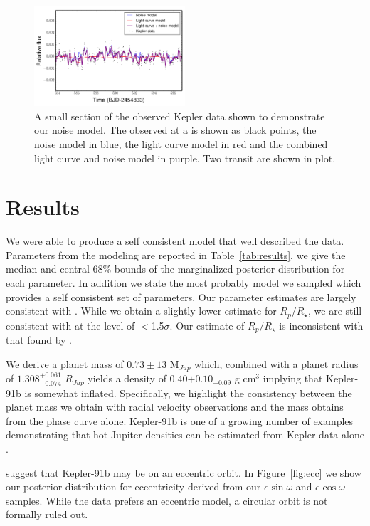 \documentclass[apjl]{emulateapj}
\begin{document}
\begin{figure}
\includegraphics[width=0.50\textwidth]{noisemodel.png}
\caption{A small section of the observed Kepler data shown to demonstrate our noise model. The observed at a is shown as black points, the noise model in blue, the light curve model in red and the combined light curve and noise model in purple. Two transit are shown in plot. }
\label{fig:filter}
\end{figure}


\section{Results}
We were able to produce a self consistent model that well described the data. Parameters from the modeling are reported in Table~\ref{tab:results}, we give the median and central 68\% bounds of the marginalized posterior distribution for each parameter. In addition we state the most probably model we sampled which provides a self consistent set of parameters. Our parameter estimates are largely consistent with \citet{lillo14}. While we obtain a slightly lower estimate for $R_{p}/R_{\star}$, we are still consistent with \citet{lillo14} at the level of $<$1.5$\sigma$. Our estimate of $R_{p}/R_{\star}$ is inconsistent with that found by \citet{sliski14}.

We derive a planet mass of $0.73\pm 13$ M$_{Jup}$ which, combined with a planet radius of $1.308^{+0.061}_{-0.074}$ $R_{Jup}$ yields a density of $0.40{+0.10}_{-0.09}$ g cm$^{3}$ implying that Kepler-91b is somewhat inflated. Specifically, we highlight the consistency between the planet mass we obtain with radial velocity observations and the mass\citet{lillo14} obtains from the phase curve alone. Kepler-91b is one of a growing number of examples demonstrating that hot Jupiter densities can be estimated from Kepler data alone \citep{barclay12,quintana13,esteves13}.

\citet{lillo14} suggest that Kepler-91b may be on an eccentric orbit. In Figure~\ref{fig:ecc} we show our posterior distribution for eccentricity derived from our $e\sin{\omega}$ and $e\cos{\omega}$ samples. While the data prefers an eccentric model, a circular orbit is not formally ruled out.
\end{document}
